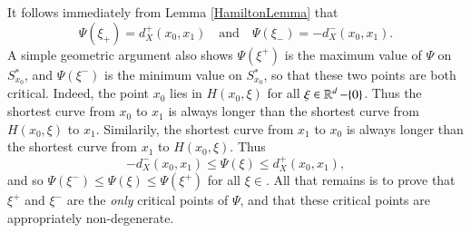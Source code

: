 %






It follows immediately from Lemma \ref{HamiltonLemma} that
%
\begin{equation}
    \Psi(\xi_+) = d_X^+(x_0,x_1) \quad\text{and}\quad \Psi(\xi_-) = - d_X^-(x_0,x_1).
\end{equation}
%
A simple geometric argument also shows $\Psi(\xi^+)$ is the maximum value of $\Psi$ on $S\!_{x_0}^*$, and $\Psi(\xi^-)$ is the minimum value on $S\!_{x_0}^*$, so that these two points are both critical. Indeed, the point $x_0$ lies in $H(x_0,\xi)$ for all $\xi \in \operatorname{\mathbb{R}}^d - \{ 0 \}$. Thus the shortest curve from $x_0$ to $x_1$ is always longer than the shortest curve from $H(x_0,\xi)$ to $x_1$. Similarily, the shortest curve from $x_1$ to $x_0$ is always longer than the shortest curve from $x_1$ to $H(x_0,\xi)$. Thus
%
\begin{equation}
    - d_X^-(x_0,x_1) \leq \Psi(\xi) \leq d_X^+(x_0,x_1),
\end{equation}
%
and so $\Psi(\xi^-) \leq \Psi(\xi) \leq \Psi(\xi^+)$ for all $\xi \in $. All that remains is to prove that $\xi^+$ and $\xi^-$ are the \emph{only} critical points of $\Psi$, and that these critical points are appropriately non-degenerate.

